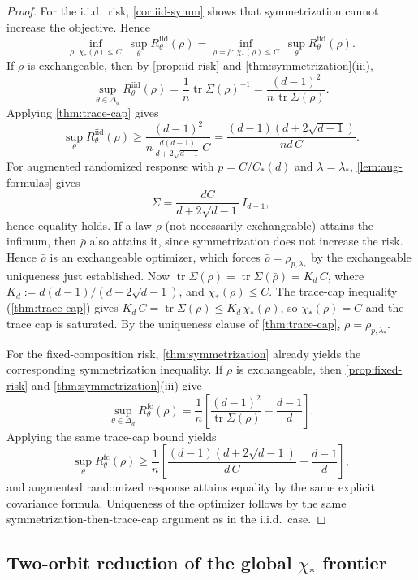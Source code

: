\documentclass[11pt]{amsart}
\theoremstyle{definition}
\DeclareMathOperator{\tr}{tr}
\begin{document}
\begin{proof}
For the i.i.d.\ risk, \cref{cor:iid-symm} shows that symmetrization cannot increase the objective. Hence
\[
\inf_{\rho:\,\chi_*(\rho)\le C}\ \sup_{\theta}R^{\mathrm{iid}}_\theta(\rho)
=
\inf_{\rho=\bar\rho:\,\chi_*(\rho)\le C}\ \sup_{\theta}R^{\mathrm{iid}}_\theta(\rho).
\]
If $\rho$ is exchangeable, then by \cref{prop:iid-risk} and \cref{thm:symmetrization}(iii),
\[
\sup_{\theta\in\Delta_d}R^{\mathrm{iid}}_\theta(\rho)
=
\frac1n\tr\Sigma(\rho)^{-1}
=
\frac{(d-1)^2}{n\,\tr\Sigma(\rho)}.
\]
Applying \cref{thm:trace-cap} gives
\[
\sup_{\theta}R^{\mathrm{iid}}_\theta(\rho)\ge
\frac{(d-1)^2}{n\,\frac{d(d-1)}{d+2\sqrt{d-1}}\,C}
=
\frac{(d-1)(d+2\sqrt{d-1})}{n d\,C}.
\]
For augmented randomized response with $p=C/C_*(d)$ and $\lambda=\lambda_*$, \cref{lem:aug-formulas} gives
\[
\Sigma=\frac{dC}{d+2\sqrt{d-1}}\,I_{d-1},
\]
hence equality holds. If a law $\rho$ (not necessarily exchangeable) attains the infimum, then $\bar\rho$ also attains it, since symmetrization does not increase the risk. Hence $\bar\rho$ is an exchangeable optimizer, which forces $\bar\rho=\rho_{p,\lambda_*}$ by the exchangeable uniqueness just established. Now $\tr\Sigma(\rho)=\tr\Sigma(\bar\rho)=K_d\,C$, where $K_d:=d(d-1)/(d+2\sqrt{d-1})$, and $\chi_*(\rho)\le C$. The trace-cap inequality (\cref{thm:trace-cap}) gives $K_d\,C=\tr\Sigma(\rho)\le K_d\,\chi_*(\rho)$, so $\chi_*(\rho)=C$ and the trace cap is saturated. By the uniqueness clause of \cref{thm:trace-cap}, $\rho=\rho_{p,\lambda_*}$.

For the fixed-composition risk, \cref{thm:symmetrization} already yields the corresponding symmetrization inequality. If $\rho$ is exchangeable, then \cref{prop:fixed-risk} and \cref{thm:symmetrization}(iii) give
\[
\sup_{\theta\in\Delta_d}R^{\mathrm{fc}}_\theta(\rho)
=
\frac1n\left[\frac{(d-1)^2}{\tr\Sigma(\rho)}-\frac{d-1}{d}\right].
\]
Applying the same trace-cap bound yields
\[
\sup_{\theta}R^{\mathrm{fc}}_\theta(\rho)\ge
\frac1n\left[
\frac{(d-1)(d+2\sqrt{d-1})}{d\,C}
-\frac{d-1}{d}
\right],
\]
and augmented randomized response attains equality by the same explicit covariance formula. Uniqueness of the optimizer follows by the same symmetrization-then-trace-cap argument as in the i.i.d.\ case.
\end{proof}

\subsection{Two-orbit reduction of the global \texorpdfstring{$\chi_*$}{chi*} frontier}
\end{document}
